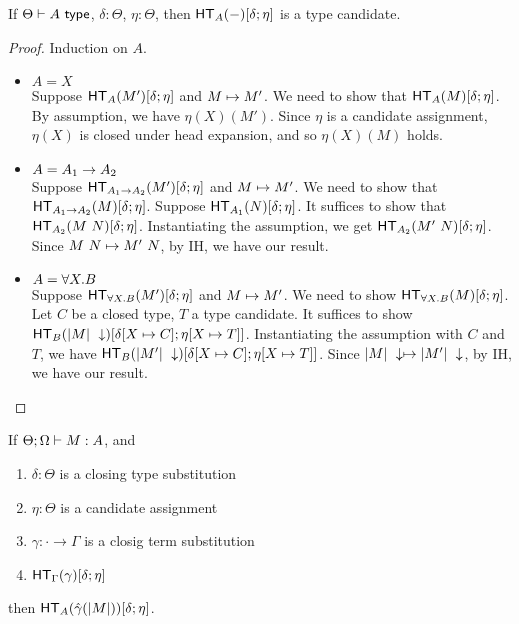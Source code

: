 \documentclass{article}
\begin{document}
\begin{lemma}\label{lem:head_exp}
If $\Theta \vdash A\ \mathsf{type}$, $\delta : \Theta$, $\eta : \Theta$, then $\mathsf{HT}_{A}(-)[\delta;\eta]$ is a type candidate.
\end{lemma}
\begin{proof}
Induction on $A$.
\begin{itemize}
\setlength\itemsep{1em}
\item $A = X$\\
Suppose $\mathsf{HT}_{A}(M')[\delta;\eta]$ and $M \mapsto M'$. We need to show that $\mathsf{HT}_{A}(M)[\delta;\eta]$.
By assumption, we have $\eta(X)(M')$. Since $\eta$ is a candidate assignment, $\eta(X)$ is closed under head expansion,
and so $\eta(X)(M)$ holds.
\item $A = A_1 \to A_2$\\
Suppose $\mathsf{HT}_{A_1 \to A_2}(M')[\delta;\eta]$ and $M \mapsto M'$.
We need to show that $\mathsf{HT}_{A_1 \to A_2}(M)[\delta;\eta]$. Suppose $\mathsf{HT}_{A_1}(N)[\delta;\eta]$.
It suffices to show that $\mathsf{HT}_{A_2}(M\ N)[\delta;\eta]$. Instantiating the assumption, we get
$\mathsf{HT}_{A_2}(M'\ N)[\delta;\eta]$. Since $M\ N \mapsto M'\ N$, by IH, we have our result.
\item $A = \forall X. B$\\
Suppose $\mathsf{HT}_{\forall X. B}(M')[\delta;\eta]$ and $M \mapsto M'$.
We need to show $\mathsf{HT}_{\forall X. B}(M)[\delta;\eta]$. Let $C$ be a closed type, $T$ a type candidate.
It suffices to show $\mathsf{HT}_{B}(|M|\ \downarrow)[\delta[X \mapsto C];\eta[X \mapsto T]]$.
Instantiating the assumption with $C$ and $T$, we have
$\mathsf{HT}_{B}(|M'|\ \downarrow)[\delta[X \mapsto C];\eta[X \mapsto T]]$.
Since $|M|\ \downarrow \mapsto |M'|\ \downarrow$, by IH, we have our result.
\end{itemize}
\end{proof}

\begin{theorem}
If $\Theta;\Omega \vdash M : A$, and
\begin{enumerate}
\item $\delta : \Theta$ is a closing type substitution
\item $\eta : \Theta$ is a candidate assignment
\item $\gamma : \cdot \to \Gamma$ is a closig term substitution
\item $\mathsf{HT}_{\Gamma}(\gamma)[\delta;\eta]$
\end{enumerate}
then $\mathsf{HT}_{A}(\hat\gamma(|M|))[\delta;\eta]$.
\end{theorem}
\end{document}
